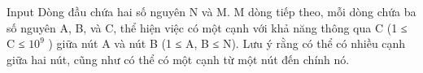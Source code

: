 Input
Dòng đầu chứa hai số nguyên N và M. M dòng tiếp theo, mỗi dòng chứa ba số nguyên A, B, và C, thể hiện việc có một cạnh với khả năng thông qua C (1 ≤ C ≤ $10^{9}$   ) giữa nút A và nút B (1 ≤ A, B ≤ N). Lưu ý rằng có thể có nhiều cạnh giữa hai nút, cũng như có thể có một cạnh từ một nút đến chính nó.